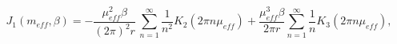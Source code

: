 \begin{equation}
J_{1}\left(m_{eff},\beta \right)=-\frac{\mu _{eff}^{2}\beta }{\left(2\pi \right)^{2}r}\, \sum _{n=1}^{\infty }\frac{1}{n^{2}}K_{2}\left(2\pi n\mu _{eff}\right)+\frac{\mu _{eff}^{3}\beta }{2\pi r}\sum _{n=1}^{\infty }\frac{1}{n}K_{3}\left(2\pi n\mu _{eff}\right),\end{equation}

